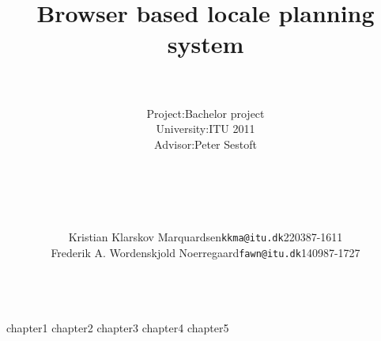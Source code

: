 \documentclass[12pt,a4paper]{report}
\begin{document}

\title{\Huge{\textsf{\textbf{Browser based locale planning system}}}}
\author{
		\hline \\
		\begin{tabular}{ l l }
		Project: & Bachelor project \\
		University: & ITU 2011 \\
		Advisor: & Peter Sestoft\\
		\end{tabular}\\
		\mbox{} \\
		\hline \\
		\mbox{}\\
		\begin{tabular} { l l l }
				Kristian Klarskov Marquardsen & \texttt{kkma@itu.dk} &220387-1611\\
				Frederik A. Wordenskjold Noerregaard & \texttt{fawn@itu.dk} & 140987-1727\\
		\end{tabular}\\
		\mbox{}}
\date{}
\maketitle

\tableofcontents

{chapter1}
{chapter2}
{chapter3}
{chapter4}
{chapter5}
\appendix
\end{document}
